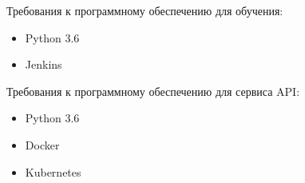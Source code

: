 Требования к программному обеспечению для обучения:
\begin{itemize}
  \item Python 3.6
  \item Jenkins
\end{itemize}

Требования к программному обеспечению для сервиса API:
\begin{itemize}
  \item Python 3.6
  \item Docker
  \item Kubernetes
\end{itemize}

